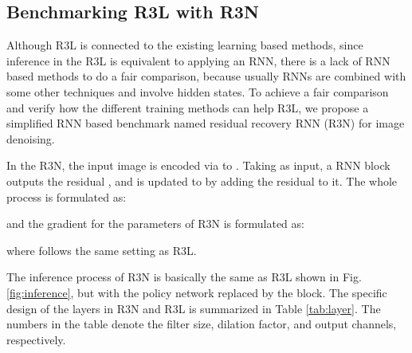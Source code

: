 \documentclass{article}
\begin{document}
\subsection{Benchmarking R3L with R3N}
Although R3L is connected to the existing learning based methods, since inference in the R3L is equivalent to applying an RNN, there is a lack of RNN based methods to do a fair comparison, because usually RNNs are combined with some other techniques and involve hidden states. To achieve a fair comparison and verify how the different training methods can help R3L, we propose a simplified RNN based benchmark named residual recovery RNN (R3N) for image denoising.

In the R3N, the input image  is encoded via  to . Taking  as input, a RNN block  outputs the residual , and  is updated to  by adding the residual to it. The whole process is formulated as:

and the gradient for the parameters of R3N is formulated as:

where  follows the same setting as R3L. \par
The inference process of R3N is basically the same as R3L shown in Fig.\ref{fig:inference}, but with the policy network replaced by the  block. The specific design of the layers in R3N and R3L is summarized in Table \ref{tab:layer}. The numbers in the table denote the filter size, dilation factor, and output channels, respectively.
\end{document}
